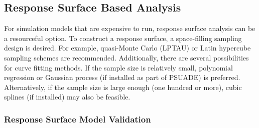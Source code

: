 \subsection{Response Surface Based Analysis}
\label{tutorial.uq.rs}

For simulation models that are expensive to run, response surface analysis can be a resourceful option. To construct a response surface, a space-filling sampling design is desired. For example, quasi-Monte Carlo (LPTAU) or Latin hypercube sampling schemes are recommended. Additionally, there are several possibilities for curve fitting methods. If the sample size is relatively small, polynomial regression or Gaussian process (if installed as part of PSUADE) is preferred. Alternatively, if the sample size is large enough (one hundred or more), cubic splines (if installed) may also be feasible.

\subsubsection{Response Surface Model Validation}

